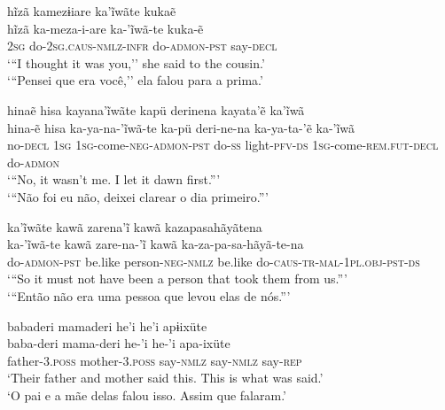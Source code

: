 \documentclass[output=paper,
modfonts,nonflat
]{langsci/langscibook}
\begin{document}
\ea   hĩzã kamezɨiare ka'ĩwãte kukaẽ \\[.3em]
\gll 	hĩzã ka-meza-i-are ka-'ĩwã-te kuka-ẽ\\
\textsc{2sg} do-\textsc{2sg.caus-nmlz-infr} do-\textsc{admon-pst} say-\textsc{decl}\\
\glt   `{``}I thought it was you,'' she said to the cousin.' \\
 `{``}Pensei que era você,'' ela falou para a prima.' \\
\z

\ea   hinaẽ hisa kayana'ĩwãte kapü derinena kayata'ẽ ka'ĩwã \\[.3em]
\gll 	hina-ẽ hisa ka-ya-na-'ĩwã-te ka-pü deri-ne-na ka-ya-ta-'ẽ ka-'ĩwã\\
no-\textsc{decl}  \textsc{1sg} \textsc{1sg}-come-\textsc{neg-admon-pst} do-\textsc{ss} light-\textsc{pfv-ds} \textsc{1sg}-come-\textsc{rem.fut-decl} do-\textsc{admon} \\
\glt  `{``}No, it wasn't me. I let it dawn first.{''}'  \\
`{``}Não foi eu não, deixei clarear o dia primeiro.{''}'\\
\z

\ea   ka'ĩwãte kawã zarena'ĩ kawã kazapasahãyãtena \\[.3em]
\gll 	ka-'ĩwã-te kawã zare-na-'ĩ kawã ka-za-pa-sa-hãyã-te-na\\
do-\textsc{admon-pst} be.like person-\textsc{neg-nmlz} be.like do-\textsc{caus-tr-mal-1pl.obj-pst}-\textsc{ds}\\
\glt    `{``}So it must not have been a person that took them from us.{''}' \\
`{``}Então não era uma pessoa que levou elas de nós.{''}' \\
\z

\ea     babaderi mamaderi he'i he'i apɨixüte \\[.3em]
\gll 	baba-deri mama-deri he-'i he-'i apa-ixüte \\
father-\textsc{3.poss} mother-\textsc{3.poss} say-\textsc{nmlz} say-\textsc{nmlz} say-\textsc{rep} \\
\glt    `Their father and mother said this. This is what was said.'\\
`O pai e a mãe delas falou isso. Assim que falaram.'\\
\z
\end{document}
